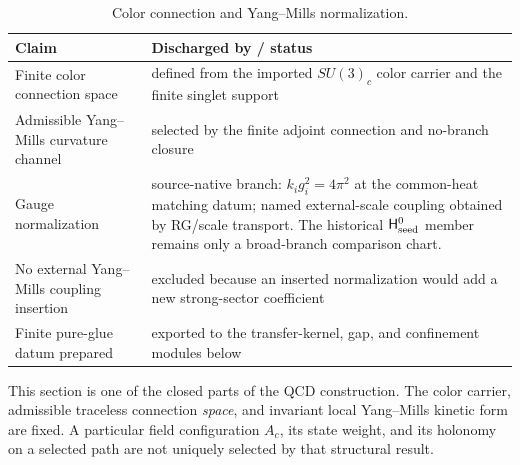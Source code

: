 \documentclass[12pt,a4paper]{article}
\providecommand{\Hseedzero}{\mathsf H_{\rm seed}^{0}}
\begin{document}
\begin{table}[htbp]
\centering
\footnotesize
\begin{tabular}{>{\raggedright\arraybackslash}p{} >{\raggedright\arraybackslash}p{}}
\toprule
Claim & Discharged by / status \\
\midrule
Finite color connection space & defined from the imported \(SU(3)_c\) color carrier and the finite singlet support \\
Admissible Yang--Mills curvature channel & selected by the finite adjoint connection and no-branch closure \\
Gauge normalization & source-native branch: \(k_i g_i^2=4\pi^2\) at the common-heat matching datum; named external-scale coupling obtained by RG/scale transport.  The historical \(\Hseedzero\) member remains only a broad-branch comparison chart. \\
No external Yang--Mills coupling insertion & excluded because an inserted normalization would add a new strong-sector coefficient \\
Finite pure-glue datum prepared & exported to the transfer-kernel, gap, and confinement modules below \\
\bottomrule
\end{tabular}
\caption[Color connection and Yang--Mills normalization]{Color connection and Yang--Mills normalization.}
\label{p10:tab:connection-ym-ledger}
\end{table}

This section is one of the closed parts of the QCD construction.  The color
carrier, admissible traceless connection \emph{space}, and invariant local
Yang--Mills kinetic form are fixed.  A particular field configuration
\(A_c\), its state weight, and its holonomy on a selected path are not uniquely
selected by that structural result.
\end{document}
